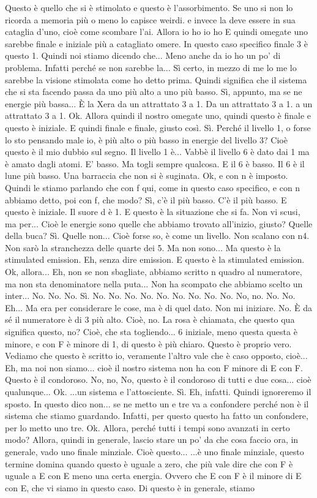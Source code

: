 \begin{soluzione}
{   Questo è quello che si è stimolato e questo è l'assorbimento. Se uno si non lo ricorda a memoria più o meno lo capisce weirdi. e invece la deve essere in sua cataglia d'uno, cioè come scombare l'ai. Allora io ho io ho E quindi omegate uno sarebbe finale e iniziale più a catagliato omere. In questo caso specifico finale 3 è questo 1. Quindi noi stiamo dicendo che... Meno anche da io ho un po' di problema. Infatti perché se non sarebbe la... Sì certo, in mezzo di me lo me lo sarebbe la visione stimolata come ho detto prima. Quindi significa che il sistema che si sta facendo passa da uno più alto a uno più basso. Sì, appunto, ma se ne energie più bassa... È la Xera da un attrattato 3 a 1. Da un attrattato 3 a 1. a un attrattato 3 a 1. Ok. Allora quindi il nostro omegate uno, quindi questo è finale e questo è iniziale. E quindi finale e finale, giusto così. Sì. Perché il livello 1, o forse lo sto pensando male io, è più alto o più basso in energie del livello 3? Cioè questo è il mio dubbio sul segno. Il livello 1 è... Vabbè il livello 6 è dato dai 1 ma è amato dagli atomi. E' basso. Ma togli sempre qualcosa. E il 6 è basso. Il 6 è il lune più basso. Una barraccia che non si è suginata. Ok, e con n è imposto. Quindi le stiamo parlando che con f qui, come in questo caso specifico, e con n abbiamo detto, poi con f, che modo? Sì, c'è il più basso. C'è il più basso. E questo è iniziale. Il suore d è 1. E questo è la situazione che si fa. Non vi scusi, ma per... Cioè le energie sono quelle che abbiamo trovato all'inizio, giusto? Quelle della buca? Sì. Quelle non... Cioè forse so, è come un livello. Non scalano con n4. Non sarò la stranchezza delle quarte dei 5. Ma non sono... Ma questo è la stimulated emission. Eh, senza dire emission. E questo è la stimulated emission. Ok, allora... Eh, non se non sbagliate, abbiamo scritto n quadro al numeratore, ma non sta denominatore nella puta... Non ha scompato che abbiamo scelto un inter... No. No. No. Sì. No. No. No. No. No. No. No. No. No. No, no. No. No. Eh... Ma era per considerare le cose, ma è di quel dato. Non mi iniziare. No. È da sé il numeratore è di 3 più alto. Cioè, no. La rosa è chiamata, che questo qua significa questo, no? Cioè, che sta togliendo... 6 iniziale, meno questa questa è minore, e con F è minore di 1, di questo è più chiaro. Questo è proprio vero. Vediamo che questo è scritto io, veramente l'altro vale che è caso opposto, cioè... Eh, ma noi non siamo... cioè il nostro sistema non ha con F minore di E con F. Questo è il condoroso. No, no, No, questo è il condoroso di tutti e due cosa... cioè qualunque... Ok. ...un sistema e l'attosciente. Sì. Eh, infatti. Quindi ignoreremo il sposto. In questo dico non... se ne metto un e tre va a confondere perché non è il sistema che stiamo guardando. Infatti, per questo questo ha fatto un confondere, per lo metto uno tre. Ok. Allora, perché tutti i tempi sono avanzati in certo modo? Allora, quindi in generale, lascio stare un po' da che cosa faccio ora, in generale, vado uno finale minziale. Cioè questo... ...è uno finale minziale, questo termine domina quando questo è uguale a zero, che più vale dire che con F è uguale a E con E meno una certa energia. Ovvero che E con F è il minore di E con E, che vi siamo in questo caso. Di questo è in generale, stiamo }
\end{soluzione}
